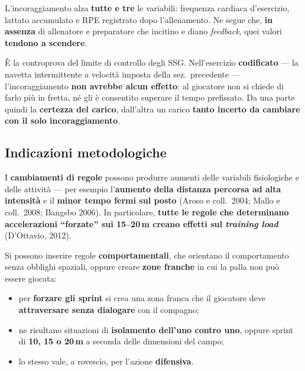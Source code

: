 L'incoraggiamento alza \textbf{tutte e tre} le variabili: frequenza cardiaca d'esercizio, lattato
accumulato e RPE registrato dopo l'allenamento. Ne segue che, \textbf{in assenza} di allenatore e
preparatore che incitino e diano \textit{feedback}, quei valori \textbf{tendono a scendere}.

È la controprova del limite di controllo degli SSG. Nell'esercizio \textbf{codificato} --- la
navetta intermittente a velocità imposta della sez.~precedente --- l'incoraggiamento
\textbf{non avrebbe alcun effetto}: al giocatore non si chiede di farlo più in fretta, né gli è
consentito superare il tempo prefissato. Da una parte quindi la \textbf{certezza del carico},
dall'altra un carico \textbf{tanto incerto da cambiare con il solo incoraggiamento}.

\subsection{Indicazioni metodologiche}

I \textbf{cambiamenti di regole} possono produrre aumenti delle variabili fisiologiche e delle
attività --- per esempio l'\textbf{aumento della distanza percorsa ad alta intensità} e il
\textbf{minor tempo fermi sul posto} (Aroso e coll.\ 2004; Mallo e coll.\ 2008; Bangsbo 2006). In
particolare, \textbf{tutte le regole che determinano accelerazioni ``forzate'' sui 15--20\,m creano
effetti sul \textit{training load}} (D'Ottavio, 2012).

Si possono inserire regole \textbf{comportamentali}, che orientano il comportamento senza obblighi
spaziali, oppure creare \textbf{zone franche} in cui la palla non può essere giocata:

\begin{itemize}
  \item per \textbf{forzare gli sprint} si crea una zona franca che il giocatore deve
    \textbf{attraversare senza dialogare} con il compagno;
  \item ne risultano situazioni di \textbf{isolamento dell'uno contro uno}, oppure sprint di
    \textbf{10, 15 o 20\,m} a seconda delle dimensioni del campo;
  \item lo stesso vale, a rovescio, per l'azione \textbf{difensiva}.
\end{itemize}

